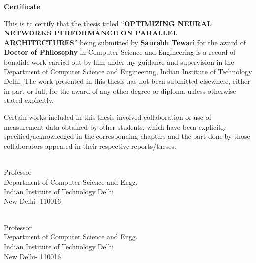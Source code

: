 {}
\begin{center}
	{\Huge \textbf{Certificate}} 
\end{center}

This is to certify that the thesis titled ``\textbf{OPTIMIZING NEURAL NETWORKS
	PERFORMANCE ON PARALLEL
	ARCHITECTURES}'' being submitted by  \textbf{Saurabh Tewari} for the award of \textbf{Doctor of Philosophy} in Computer Science and Engineering is a record of bonafide work carried out by him  under my guidance and supervision in the Department of Computer Science and Engineering, Indian Institute of Technology Delhi. The work presented in this thesis has not been submitted elsewhere, either in part or full, for the award of any other degree or diploma unless otherwise stated explicitly. 

Certain works included in this thesis involved collaboration or use of measurement data obtained by other students, which have been explicitly specified/acknowledged in the corresponding chapters and the part done by those collaborators appeared in their respective reports/theses.

\vspace {10 pc}

\begin{multicols}{2}
 \\
Professor \\
Department of Computer Science and Engg. \\
Indian Institute of Technology Delhi \\
New Delhi- 110016 \\
\columnbreak

\\
Professor \\
Department of Computer Science and Engg.\\
Indian Institute of Technology Delhi \\
New Delhi- 110016
\end{multicols}